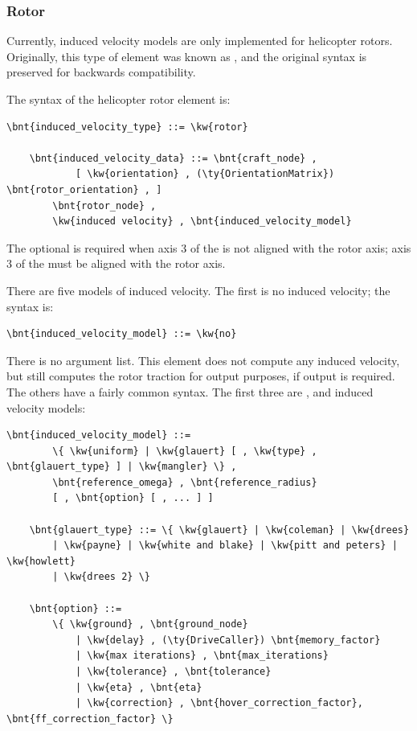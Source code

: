 \subsubsection{Rotor}
\label{sec:EL:AERO:INDVEL:ROTOR}
Currently, induced velocity models are only implemented
for helicopter rotors.
Originally, this type of element was known as ,
and the original syntax is preserved for backwards compatibility.

The syntax of the helicopter rotor  element is:
\begin{Verbatim}[commandchars=\\\{\}]
    \bnt{induced_velocity_type} ::= \kw{rotor}

    \bnt{induced_velocity_data} ::= \bnt{craft_node} ,
            [ \kw{orientation} , (\ty{OrientationMatrix}) \bnt{rotor_orientation} , ]
        \bnt{rotor_node} ,
        \kw{induced velocity} , \bnt{induced_velocity_model}
\end{Verbatim}
The optional  is required when axis 3 
of the  is not aligned with the rotor axis; axis 3
of the  must be aligned with the rotor axis.

There are five models of induced velocity. 
The first is no induced velocity; the syntax is:
\begin{Verbatim}[commandchars=\\\{\}]
    \bnt{induced_velocity_model} ::= \kw{no}
\end{Verbatim}
There is no argument list. This element does not compute any induced
velocity, but still computes the rotor traction for output purposes,
if output is required.
The others have a fairly common syntax.  The first three are
,  and  induced velocity
models:
\begin{Verbatim}[commandchars=\\\{\}]
    \bnt{induced_velocity_model} ::=
        \{ \kw{uniform} | \kw{glauert} [ , \kw{type} , \bnt{glauert_type} ] | \kw{mangler} \} , 
        \bnt{reference_omega} , \bnt{reference_radius}
        [ , \bnt{option} [ , ... ] ]

    \bnt{glauert_type} ::= \{ \kw{glauert} | \kw{coleman} | \kw{drees}
        | \kw{payne} | \kw{white and blake} | \kw{pitt and peters} | \kw{howlett}
        | \kw{drees 2} \}

    \bnt{option} ::=
        \{ \kw{ground} , \bnt{ground_node}
            | \kw{delay} , (\ty{DriveCaller}) \bnt{memory_factor}
            | \kw{max iterations} , \bnt{max_iterations}
            | \kw{tolerance} , \bnt{tolerance}
            | \kw{eta} , \bnt{eta}
            | \kw{correction} , \bnt{hover_correction_factor}, \bnt{ff_correction_factor} \}
\end{Verbatim}

